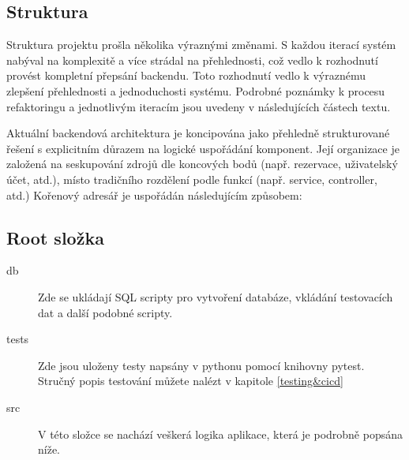 
\subsection{Struktura}
Struktura projektu prošla několika výraznými změnami. S každou iterací systém nabýval na komplexitě a více strádal na přehlednosti, což vedlo k rozhodnutí provést kompletní přepsání backendu. Toto rozhodnutí vedlo k výraznému zlepšení přehlednosti a jednoduchosti systému. Podrobné poznámky k procesu refaktoringu a jednotlivým iteracím jsou uvedeny v následujících částech textu.

Aktuální backendová architektura je koncipována jako přehledně strukturované řešení s explicitním důrazem na logické uspořádání komponent. Její organizace je založená na seskupování zdrojů dle koncových bodů (např. rezervace, uživatelský účet, atd.), místo tradičního rozdělení podle funkcí (např. service, controller, atd.)
Kořenový adresář je uspořádán následujícím způsobem:

\subsection{Root složka}
\begin{description}
    \item[db] 
    Zde se ukládají SQL scripty pro vytvoření databáze, vkládání testovacích dat a další podobné scripty.
    \item[tests]  
    Zde jsou uloženy testy napsány v pythonu pomocí knihovny pytest. Stručný popis testování můžete nalézt v kapitole \ref{testing&cicd}
    \item[src] 
    V této složce se nachází veškerá logika aplikace, která je podrobně popsána níže.
\end{description}

